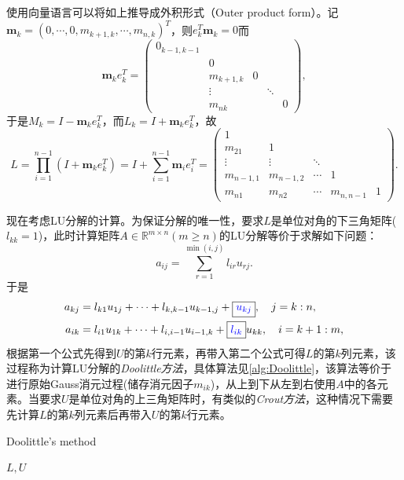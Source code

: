\documentclass[a4paper,10pt]{ctexart}
\begin{document}
\noindent 使用向量语言可以将如上推导成外积形式（Outer product form）。记$ \bm{m}_k = (0,\cdots ,0,m_{k+1,k},\cdots ,m_{n,k})^T $，则$ e_k^T \bm{m}_k=0 $而
\[
    \bm{m}_k  e_k^T = 
    \begin{pmatrix}
        0_{k-1,k-1} & & & & \\
        & 0 & & & \\
        & m_{k+1,k} & 0 & &\\
        & \vdots & & \ddots &\\
        & m_{nk} & & & 0
    \end{pmatrix},
\]
于是$ M_k = I - \bm{m}_k e_k^T $，而$ L_k = I + \bm{m}_k e^T_k $，故
\[
    L = \prod_{i=1}^{n-1}(I+\bm{m}_k e_k^T) = I + \sum_{i=1}^{n-1}\bm{m}_i e_i^T = 
    \begin{pmatrix}
        1 & & & & \\
        m_{21} & 1 & & & \\
        \vdots & \vdots & \ddots & &\\
        m_{n-1,1} & m_{n-1,2} & \cdots & 1 &\\
        m_{n1} & m_{n2} & \cdots & m_{n,n-1} & 1
    \end{pmatrix}.
\]

现在考虑LU分解的计算。为保证分解的唯一性，要求$ L $是单位对角的下三角矩阵($ l_{kk}=1 $)，此时计算矩阵$ A\in \mathbb{R}^{m\times n} (m\geqslant n)$的LU分解等价于求解如下问题：
\begin{equation}
    a_{ij} = \sum_{r=1}^{\min(i,j)} l_{ir} u_{rj}.
\end{equation}
于是
\[
    \begin{aligned}
        a_{kj} &= l_{k1}u_{1 j}+\cdots +l_{k,k-1}u_{k-1,j}+ \boxed{\textcolor{blue}{u_{kj}}},\quad j=k:n,\\
        a_{ik} &= l_{i1}u_{1 k}+\cdots +l_{i,i-1}u_{i-1,k}+ \boxed{\textcolor{blue}{l_{ik}}}u_{kk},\quad i=k+1:m,
    \end{aligned}
\]
根据第一个公式先得到$ U $的第$ k $行元素，再带入第二个公式可得$ L $的第$ k $列元素，该过程称为计算LU分解的\emph{Doolittle方法}，具体算法见\ref{alg:Doolittle}，该算法等价于进行原始Gauss消元过程(储存消元因子$ m_{ik} $)，从上到下从左到右使用$ A $中的各元素。当要求$ U $是单位对角的上三角矩阵时，有类似的\emph{Crout方法}，这种情况下需要先计算$ L $的第$ k $列元素后再带入$ U $的第$ k $行元素。

\begin{algorithm}[htbp]
    \caption{Doolittle's method}\label{alg:Doolittle}
    \Return $ L,U $\;
\end{algorithm}
\end{document}

